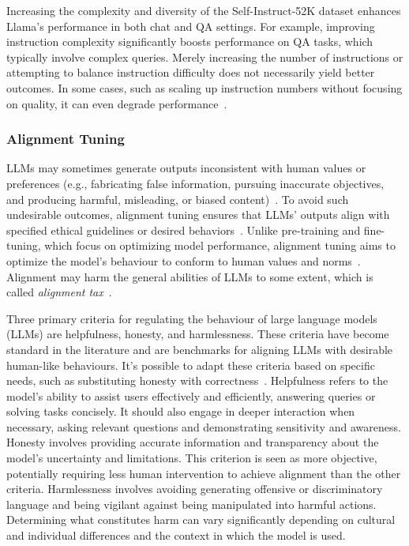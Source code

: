 Increasing the complexity and diversity of the Self-Instruct-52K dataset enhances Llama's performance in both chat and QA settings.
For example, improving instruction complexity significantly boosts performance on QA tasks, which typically involve complex queries.
Merely increasing the number of instructions or attempting to balance instruction difficulty does not necessarily yield better outcomes.
In some cases, such as scaling up instruction numbers without focusing on quality, it can even degrade performance~\cite{survey}.

\subsubsection{Alignment Tuning}
\label{subsec:alignment-tuning}

LLMs may sometimes generate outputs inconsistent with human values or preferences (e.g., fabricating false information, pursuing inaccurate objectives, and producing harmful, misleading, or biased content)~\cite{ouyang2022training, kenton2021alignment}.
To avoid such undesirable outcomes, alignment tuning ensures that LLMs' outputs align with specified ethical guidelines or desired behaviors~\cite{survey}.
Unlike pre-training and fine-tuning, which focus on optimizing model performance, alignment tuning aims to optimize the model's behaviour to conform to human values and norms~\cite{survey}.
Alignment may harm the general abilities of LLMs to some extent, which is called \textit{alignment tax}~\cite{askell2021general}.

Three primary criteria for regulating the behaviour of large language models (LLMs) are helpfulness, honesty, and harmlessness.
These criteria have become standard in the literature and are benchmarks for aligning LLMs with desirable human-like behaviours.
It's possible to adapt these criteria based on specific needs, such as substituting honesty with correctness~\cite{glaese2022improving}.
Helpfulness refers to the model's ability to assist users effectively and efficiently, answering queries or solving tasks concisely.
It should also engage in deeper interaction when necessary, asking relevant questions and demonstrating sensitivity and awareness.
Honesty involves providing accurate information and transparency about the model's uncertainty and limitations.
This criterion is seen as more objective, potentially requiring less human intervention to achieve alignment than the other criteria.
Harmlessness involves avoiding generating offensive or discriminatory language and being vigilant against being manipulated into harmful actions.
Determining what constitutes harm can vary significantly depending on cultural and individual differences and the context in which the model is used.

